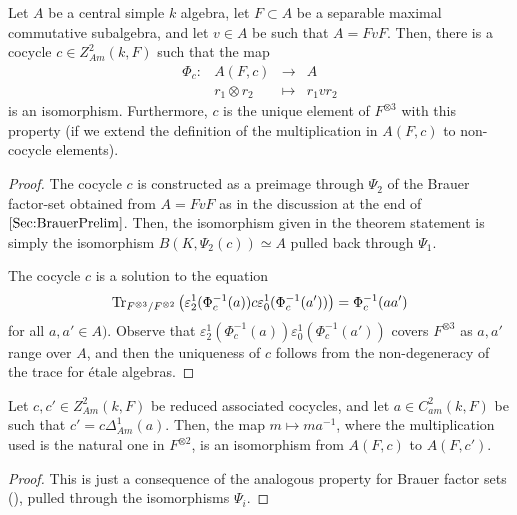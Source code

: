     \begin{theorem}\label{thm:IsomAmiAlgebra}
        Let \(A\) be a central simple \(k\) algebra, let \(F \subset A\) be a separable maximal commutative subalgebra, and let \(v \in A\) be such that \(A = FvF\). Then, there is a cocycle \(c \in Z^2_{Am}(k,F)\) such that the map
        \[\begin{array}{rlcl}
            \Phi_c\colon &A(F,c) &\to &A \\
            &r_1 \otimes r_2 &\mapsto &r_1 v r_2
        \end{array}\]
        is an isomorphism. Furthermore, \(c\) is the unique element of \(F^{\otimes 3}\) with this property (if we extend the definition of the multiplication in \(A(F,c)\) to non-cocycle elements).
    \end{theorem}

    \begin{proof}
        The cocycle \(c\) is constructed as a preimage through \(\Psi_2\) of the Brauer factor-set obtained from \(A = FvF\) as in the discussion at the end of \(\Cref{Sec:BrauerPrelim}\). Then, the isomorphism given in the theorem statement is simply the isomorphism \(B(K,\Psi_2(c)) \simeq A\) pulled back through \(\Psi_1\).
        
        The cocycle \(c\) is a solution to the equation
        \[\operatorname{Tr}_{F^{\otimes 3}/F^{\otimes 2}} \left(\varepsilon_2^1(\Phi_c^{-1}(a))c\varepsilon_0^1(\Phi_c^{-1}(a'))\right) = \Phi_c^{-1}(aa')\]
        for all \(a,a' \in A)\). Observe that \(\varepsilon_2^1(\Phi_c^{-1}(a))\varepsilon_0^1(\Phi_c^{-1}(a'))\) covers \(F^{\otimes 3}\) as \(a,a'\) range over \(A\), and then the uniqueness of \(c\) follows from the non-degeneracy of the trace for étale algebras.
    \end{proof}

    \begin{cor}\label{cor:AssoCocyIsomAmitsur}
        Let \(c,c' \in Z_{Am}^2(k,F)\) be reduced associated cocycles, and let \(a \in C_{am}^2(k,F)\) be such that \(c' = c\Delta_{Am}^1(a)\). Then, the map \(m \mapsto ma^{-1}\), where the multiplication used is the natural one in \(F^{\otimes 2}\), is an isomorphism from \(A(F,c)\) to \(A(F,c')\).
    \end{cor}

    \begin{proof}
        This is just a consequence of the analogous property for Brauer factor sets (), pulled through the isomorphisms \(\Psi_i\).
    \end{proof}

